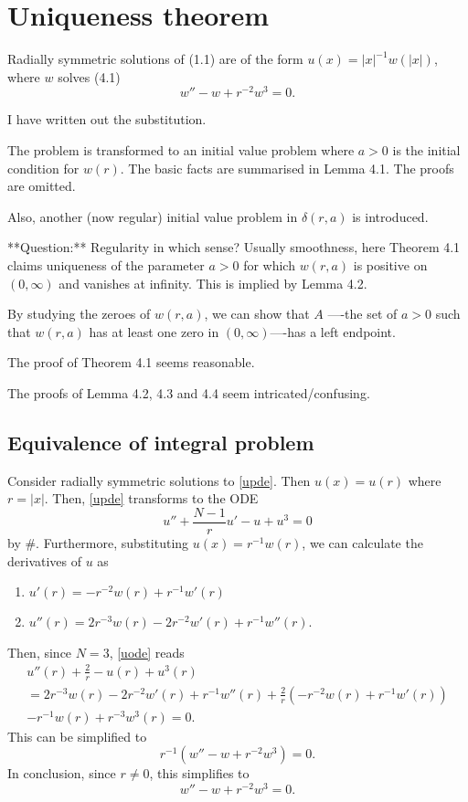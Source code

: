 \documentclass{article}
\newcommand{\be}{\begin{equation}}
\newcommand{\ee}{\end{equation}}
\newcommand{\new}{\color{NavyBlue}}
\numberwithin{equation}{section}
\begin{document}
\section{Uniqueness theorem}
{\new 
Radially symmetric solutions of (1.1) are of the form $u(x)=|x|^{-1}w(|x|)$, where $w$ solves (4.1) $$w''-w+r^{-2}w^3=0.$$

I have written out the substitution.

The problem is transformed to an initial value problem where $a>0$ is the initial condition for $w(r)$. The basic facts are summarised in Lemma 4.1. The proofs are omitted. 

Also, another (now regular) initial value problem in $\delta(r,a)$ is introduced. 

**Question:** Regularity in which sense? Usually smoothness, here 
Theorem 4.1 claims uniqueness of the parameter $a>0$ for which $w(r, a)$ is positive on $(0, \infty)$ and vanishes at infinity. This is implied by Lemma 4.2.

By studying the zeroes of $w(r,a)$, we can show that $A$ ----the set of $a>0$ such that $w(r, a)$ has at least one zero in $(0, \infty)$----has a left endpoint.

The proof of Theorem 4.1 seems reasonable.

The proofs of Lemma 4.2, 4.3 and 4.4 seem intricated/confusing. }
\subsection{Equivalence of integral problem}
Consider radially symmetric solutions to \eqref{upde}. Then $u(x) = u(r)$ where $r=|x|$. Then, \eqref{upde} transforms to the ODE
\be \label{uode} u'' + \frac{N-1}{r} u' - u + u^3 = 0 \ee 
by \#. Furthermore, substituting $u(x) = r^{-1}w(r)$, we can calculate the derivatives of $u$ as
\begin{enumerate}
    \item $u'(r) = -r^{-2}w(r) + r^{-1}w'(r)$
    \item $u''(r) = 2r^{-3}w(r) - 2r^{-2}w'(r) + r^{-1}w''(r)$.
\end{enumerate}
Then, since $N=3$, \eqref{uode} reads
\begin{multline} 
u''(r) + \frac{2}{r} - u(r) + u^3(r) \\
= 2r^{-3}w(r) - 2r^{-2}w'(r) + r^{-1}w''(r)
+ \frac{2}{r}\left(-r^{-2}w(r) + r^{-1}w'(r)\right) \\
- r^{-1}w(r) + r^{-3}w^3(r) = 0.
\end{multline}
This can be simplified to
$$ r^{-1}\left(w'' - w + r^{-2}w^3 \right) = 0. $$
In conclusion, since $r\neq 0$, this simplifies to
\be \label{wode} w'' - w + r^{-2}w^3 = 0. \ee
\end{document}
